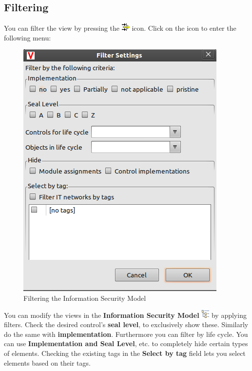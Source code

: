 \documentclass[a4paper,10pt]{book}
\begin{document}
\subsection{Filtering}
You can filter the view by pressing the \includegraphics[height=2ex]{Icon/Filter.png} icon.
Click on the icon to enter the following menu:
\newline
\begin{figure}[htb!]
  \centering
  \includegraphics[scale=.40]{Screenshot/Filtern_gsmodell-en.png}
  \caption{\label{Filtering the Information Security Model} Filtering the Information Security Model}
\end{figure}
\newline
You can modify the views in the \textbf{Information Security Model} \includegraphics[height=2ex]{Icon/GS_Modell.png} by applying filters.
Check the desired control's \textbf{seal level}, to exclusively show these. Similarly do the same with \textbf{implementation}. Furthermore you can filter by life cycle. You can use \textbf{Implementation and Seal Level}, etc. to completely hide certain types of elements. Checking the existing tags in the \textbf{Select by tag} field lets you select elements based on their tags.
\end{document}
